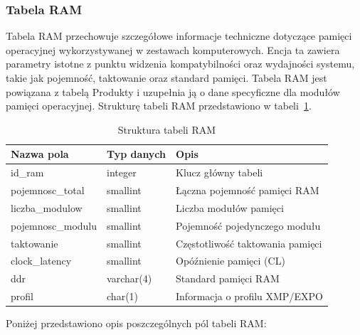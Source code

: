 \documentclass[a4paper,twoside,12pt]{book}
\begin{document}
\subsubsection{Tabela RAM}
Tabela RAM przechowuje szczegółowe informacje techniczne dotyczące pamięci
operacyjnej wykorzystywanej w zestawach komputerowych. Encja ta zawiera parametry
istotne z punktu widzenia kompatybilności oraz wydajności systemu, takie jak
pojemność, taktowanie oraz standard pamięci. Tabela RAM jest powiązana z tabelą
Produkty i uzupełnia ją o dane specyficzne dla modułów pamięci operacyjnej.
Strukturę tabeli RAM przedstawiono w tabeli~\ref{tab:ram}.

\begin{table}[H]
\centering
\caption{Struktura tabeli RAM}
\label{tab:ram}
\begin{tabular}{lll}
\hline
Nazwa pola & Typ danych & Opis \\ \hline
id\_ram & integer & Klucz główny tabeli \\
pojemnosc\_total & smallint & Łączna pojemność pamięci RAM \\
liczba\_modulow & smallint & Liczba modułów pamięci \\
pojemnosc\_modulu & smallint & Pojemność pojedynczego modułu \\
taktowanie & smallint & Częstotliwość taktowania pamięci \\
clock\_latency & smallint & Opóźnienie pamięci (CL) \\
ddr & varchar(4) & Standard pamięci RAM \\
profil & char(1) & Informacja o profilu XMP/EXPO \\ \hline
\end{tabular}
\end{table}

Poniżej przedstawiono opis poszczególnych pól tabeli RAM:
\end{document}
